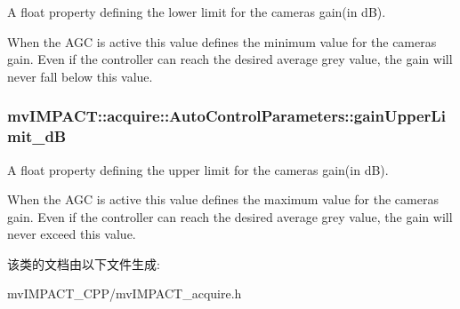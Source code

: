 A float property defining the lower limit for the cameras gain(in d\+B). 

When the A\+G\+C is active this value defines the minimum value for the cameras gain. Even if the controller can reach the desired average grey value, the gain will never fall below this value. \hypertarget{classmv_i_m_p_a_c_t_1_1acquire_1_1_auto_control_parameters_a876d25d570ecd186687d6a72aea34e54}{
\subsubsection[{gain\+Upper\+Limit\+\_\+d\+B}]{ mv\+I\+M\+P\+A\+C\+T\+::acquire\+::\+Auto\+Control\+Parameters\+::gain\+Upper\+Limit\+\_\+d\+B}}\label{classmv_i_m_p_a_c_t_1_1acquire_1_1_auto_control_parameters_a876d25d570ecd186687d6a72aea34e54}


A float property defining the upper limit for the cameras gain(in d\+B). 

When the A\+G\+C is active this value defines the maximum value for the cameras gain. Even if the controller can reach the desired average grey value, the gain will never exceed this value. 

该类的文档由以下文件生成\+:\begin{DoxyCompactItemize}
\item 
mv\+I\+M\+P\+A\+C\+T\+\_\+\+C\+P\+P/mv\+I\+M\+P\+A\+C\+T\+\_\+acquire.\+h\end{DoxyCompactItemize}
